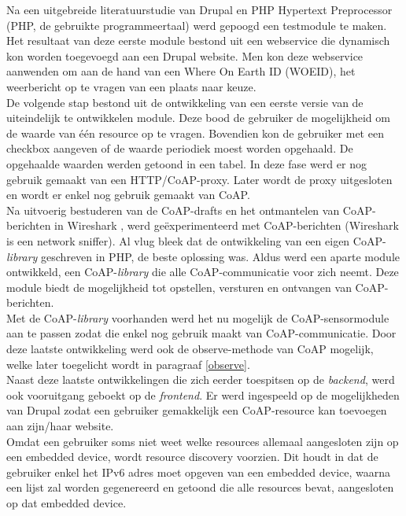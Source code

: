 Na een uitgebreide literatuurstudie van Drupal en PHP Hypertext Preprocessor (PHP, de gebruikte programmeertaal) werd gepoogd een testmodule te maken. Het resultaat van deze eerste module bestond uit een webservice die dynamisch kon worden toegevoegd aan een Drupal website. Men kon deze webservice aanwenden om aan de hand van een Where On Earth ID (WOEID), het weerbericht op te vragen van een plaats naar keuze.\\
De volgende stap bestond uit de ontwikkeling van een eerste versie van de uiteindelijk te ontwikkelen module. Deze bood de gebruiker de mogelijkheid om de waarde van \'{e}\'{e}n resource op te vragen. Bovendien kon de gebruiker met een checkbox aangeven of de waarde periodiek moest worden opgehaald. De opgehaalde waarden werden getoond in een tabel. In deze fase werd er nog gebruik gemaakt van een HTTP/CoAP-proxy. Later wordt de proxy uitgesloten en wordt er enkel nog gebruik gemaakt van CoAP.\\
Na uitvoerig bestuderen van de CoAP-drafts en het ontmantelen van CoAP-berichten in Wireshark \cite{wireshark}, werd ge\"{e}xperimenteerd met CoAP-berichten (Wireshark is een network sniffer). Al vlug bleek dat de ontwikkeling van een eigen CoAP-\textit{library} geschreven in PHP, de beste oplossing was. Aldus werd een aparte module ontwikkeld, een CoAP-\textit{library} die alle CoAP-communicatie voor zich neemt. Deze module biedt de mogelijkheid tot opstellen, versturen en ontvangen van CoAP-berichten.\\
Met de CoAP-\textit{library} voorhanden werd het nu mogelijk de CoAP-sensormodule aan te passen zodat die enkel nog gebruik maakt van CoAP-communicatie. Door deze laatste ontwikkeling werd ook de observe-methode van CoAP mogelijk, welke later toegelicht wordt in paragraaf \ref{observe}.\\
Naast deze laatste ontwikkelingen die zich eerder toespitsen op de \textit{backend}, werd ook vooruitgang geboekt op de \textit{frontend}. Er werd ingespeeld op de mogelijkheden van Drupal zodat een gebruiker gemakkelijk een CoAP-resource kan toevoegen aan zijn/haar website.\\
Omdat een gebruiker soms niet weet welke resources allemaal aangesloten zijn op een embedded device, wordt resource discovery voorzien. Dit houdt in dat de gebruiker enkel het IPv6 adres moet opgeven van een embedded device, waarna een lijst zal worden gegenereerd en getoond die alle resources bevat, aangesloten op dat embedded device.\\
